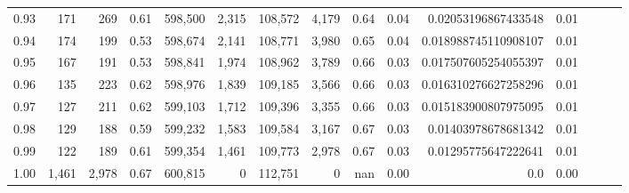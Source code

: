\begin{tabular}{rrrrrrrrrrrrrrr}
0.93 &     171 &    269 &  0.61 &  598,500 &    2,315 &  108,572 &    4,179 &  0.64 &  0.04 &   0.02053196867433548 &      0.01 \\
0.94 &     174 &    199 &  0.53 &  598,674 &    2,141 &  108,771 &    3,980 &  0.65 &  0.04 &  0.018988745110908107 &      0.01 \\
0.95 &     167 &    191 &  0.53 &  598,841 &    1,974 &  108,962 &    3,789 &  0.66 &  0.03 &  0.017507605254055397 &      0.01 \\
0.96 &     135 &    223 &  0.62 &  598,976 &    1,839 &  109,185 &    3,566 &  0.66 &  0.03 &  0.016310276627258296 &      0.01 \\
0.97 &     127 &    211 &  0.62 &  599,103 &    1,712 &  109,396 &    3,355 &  0.66 &  0.03 &  0.015183900807975095 &      0.01 \\
0.98 &     129 &    188 &  0.59 &  599,232 &    1,583 &  109,584 &    3,167 &  0.67 &  0.03 &   0.01403978678681342 &      0.01 \\
0.99 &     122 &    189 &  0.61 &  599,354 &    1,461 &  109,773 &    2,978 &  0.67 &  0.03 &   0.01295775647222641 &      0.01 \\
1.00 &   1,461 &  2,978 &  0.67 &  600,815 &        0 &  112,751 &        0 &   nan &  0.00 &                   0.0 &      0.00 \\
\bottomrule
\end{tabular}
